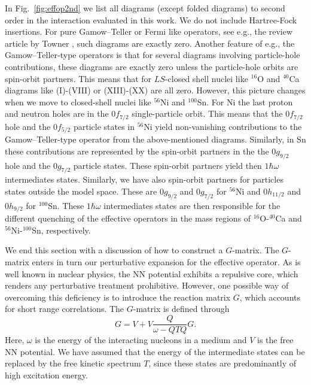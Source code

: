 In Fig.\ \ref{fig:effop2nd} we list all diagrams (except folded diagrams)  
to second order in the interaction evaluated in this
work. We do not include Hartree-Fock insertions. For pure  
Gamow--Teller or Fermi like operators,
see e.g., the review article by Towner \cite{tow87}, such diagrams are exactly
zero. 
Another feature of e.g., the Gamow--Teller-type operators  
is that for several diagrams involving particle-hole contributions,
these diagrams are exactly zero unless the particle-hole orbits are
spin-orbit partners. This means that for $LS$-closed shell nuclei 
like $^{16}$O and $^{40}$Ca diagrams like (I)-(VIII) or 
(XIII)-(XX) are all zero. However, this picture changes when we
move to closed-shell nuclei like 
$^{56}$Ni and $^{100}$Sn. For Ni the last proton and neutron holes
are in the $0f_{7/2}$ single-particle orbit. This means that the  
$0f_{7/2}$ hole and the $0f_{5/2}$  
particle states in $^{56}$Ni yield non-vanishing contributions to 
the Gamow--Teller-type operator from the above-mentioned diagrams. Similarly, 
in Sn these contributions are represented by the spin-orbit partners 
in the the $0g_{9/2}$  hole and the $0g_{7/2}$ 
particle states. These spin-orbit partners yield then 
$1\hbar\omega$ intermediates states. Similarly, we have also 
spin-orbit partners for particles states outside the model space.
These are $0g_{9/2}$ and  $0g_{7/2}$ for $^{56}$Ni and 
$0h_{11/2}$ and  $0h_{9/2}$
for $^{100}$Sn. These $1\hbar\omega$ intermediates states are 
then responsible for the different quenching 
of the effective operators in the mass regions of 
$^{16}$O-$^{40}$Ca and $^{56}$Ni-$^{100}$Sn, respectively. 

We end this section with a discussion of how to construct a 
$G$-matrix. The $G$-matrix enters in turn our perturbative expansion
for the effective operator.
As is well known in nuclear physics, the NN potential
exhibits a repulsive core, which renders any perturbative
treatment prohibitive. However, one possible way of overcoming
this deficiency is to introduce
the reaction matrix $G$, which accounts for
short range correlations. The $G$-matrix is defined through
\begin{equation}
  G=V+V\frac{Q}{\omega - QTQ}G.
  \label{eq:gmat}
\end{equation}
Here, $\omega$ is the energy of the interacting nucleons in
a medium and $V$ is the free NN potential.
We have assumed that the energy of the intermediate
states can be replaced by the free kinetic spectrum $T$, since
these states are predominantly of high excitation energy.

